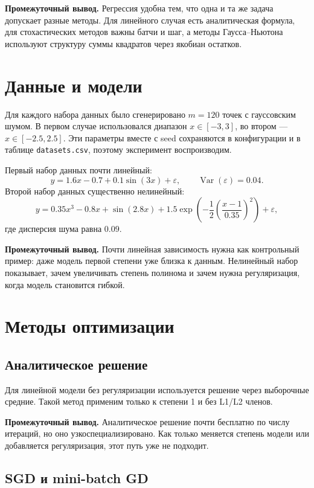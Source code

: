 \documentclass[14pt,a4paper]{extarticle}
\begin{document}
\textbf{Промежуточный вывод.} Регрессия удобна тем, что одна и та же задача допускает разные методы. Для линейного случая есть аналитическая формула, для стохастических методов важны батчи и шаг, а методы Гаусса--Ньютона используют структуру суммы квадратов через якобиан остатков.

\section{Данные и модели}

Для каждого набора данных было сгенерировано $m=120$ точек с гауссовским шумом. В первом случае использовался диапазон $x\in[-3,3]$, во втором --- $x\in[-2.5,2.5]$. Эти параметры вместе с seed сохраняются в конфигурации и в таблице \texttt{datasets.csv}, поэтому эксперимент воспроизводим.

Первый набор данных почти линейный:
\[
    y=1.6x-0.7+0.1\sin(3x)+\varepsilon,\qquad \operatorname{Var}(\varepsilon)=0.04.
\]
Второй набор данных существенно нелинейный:
\[
    y=0.35x^3-0.8x+\sin(2.8x)+1.5\exp\left(-\frac12\left(\frac{x-1}{0.35}\right)^2\right)+\varepsilon,
\]
где дисперсия шума равна $0.09$.

\textbf{Промежуточный вывод.} Почти линейная зависимость нужна как контрольный пример: даже модель первой степени уже близка к данным. Нелинейный набор показывает, зачем увеличивать степень полинома и зачем нужна регуляризация, когда модель становится гибкой.

\section{Методы оптимизации}

\subsection{Аналитическое решение}

Для линейной модели без регуляризации используется решение через выборочные средние. Такой метод применим только к степени 1 и без L1/L2 членов.

\textbf{Промежуточный вывод.} Аналитическое решение почти бесплатно по числу итераций, но оно узкоспециализировано. Как только меняется степень модели или добавляется регуляризация, этот путь уже не подходит.

\subsection{SGD и mini-batch GD}
\end{document}
